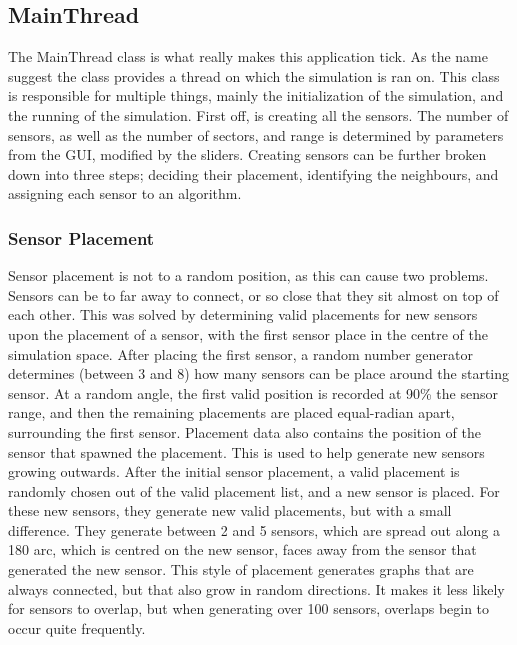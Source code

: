 \subsection{MainThread}

The MainThread class is what really makes this application tick. As the name suggest the 
class provides a thread on which the simulation is ran on. This class is responsible for 
multiple things, mainly the initialization of the simulation, and the running of the 
simulation. First off, is creating all the sensors. The number of sensors, as well as the 
number of sectors, and range is determined by parameters from the GUI, modified by the 
sliders. Creating sensors can be further broken down into three steps;  deciding their 
placement, identifying the neighbours, and assigning each sensor to an algorithm. 
	
\subsubsection{Sensor Placement}

Sensor placement is not to a random position, as this can cause two problems. Sensors can be 
to far away to connect, or so close that they sit almost on top of each other. This was solved 
by determining valid placements for new sensors upon the placement of a sensor, with the first 
sensor place in the centre of the simulation space. After placing the first sensor, a random 
number generator determines (between 3 and 8) how many sensors can be place around the 
starting sensor. At a random angle, the first valid position is recorded at 90\% the sensor 
range, and then the remaining placements are placed equal-radian apart, surrounding the first 
sensor. Placement data also contains the position of the sensor that spawned the placement. 
This is used to help generate new sensors growing outwards. After the initial sensor 
placement, a valid placement is randomly chosen out of the valid placement list, and a new 
sensor is placed. For these new sensors, they generate new valid placements, but with a small 
difference. They generate between 2 and 5 sensors, which are spread out along a 180 arc, which 
is centred on the new sensor, faces away from the sensor that generated the new sensor. This 
style of placement generates graphs that are always connected, but that also grow in random 
directions. It makes it less likely for sensors to overlap, but when generating over 100 
sensors, overlaps begin to occur quite frequently.

